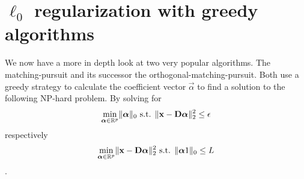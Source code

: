 \section{$\ell_0$ regularization with greedy algorithms}
We now have a more in depth look at two very popular algorithms. 
The matching-pursuit and its successor the orthogonal-matching-pursuit.
Both use a greedy strategy to calculate the coefficient vector $\vec{\alpha}$ to
find
a solution to the following NP-hard problem. By solving for
\begin{equation}
\min_{\boldsymbol{\mathrm{\alpha}}\in\mathbb{R}^{p}}   \lVert \boldsymbol{\mathrm{\alpha}} \rVert_{0}   \textrm{
s.t. }
\lVert \boldsymbol{\mathrm{x}} - \boldsymbol{\mathrm{D}}\boldsymbol{\mathrm{\alpha}} \rVert^{2}_{2} \leq \epsilon
\end{equation}
respectively
\begin{equation}
\min_{\boldsymbol{\mathrm{\alpha}}\in\mathbb{R}^{p}}  \lVert \boldsymbol{\mathrm{x}} - \boldsymbol{\mathrm{D}}\boldsymbol{\mathrm{\alpha}}
\rVert^{2}_{2} \textrm{ s.t.
} \lVert \boldsymbol{\mathrm{\alpha}}	1 \rVert_{0} \leq L
\end{equation}.

